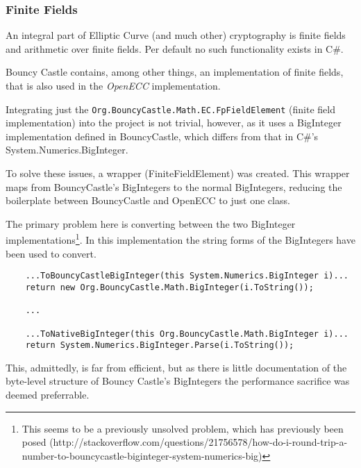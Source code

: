 \subsubsection{Finite Fields}

An integral part of Elliptic Curve (and much other) cryptography is finite fields and arithmetic
over finite fields. Per default no such functionality exists in C\#.

Bouncy Castle contains, among other things, an implementation of finite fields, that is also used
in the \emph{OpenECC} implementation.

Integrating just the \verb+Org.BouncyCastle.Math.EC.FpFieldElement+ (finite field implementation) into
the project is not trivial, however, as it uses a BigInteger implementation defined in BouncyCastle,
which differs from that in C\#'s System.Numerics.BigInteger.

To solve these issues, a wrapper (FiniteFieldElement) was created. This wrapper maps from BouncyCastle's
BigIntegers to the normal BigIntegers, reducing the boilerplate between BouncyCastle and OpenECC to
just one class.

The primary problem here is converting between the two BigInteger implementations\footnote{This seems
to be a previously unsolved problem, which has previously been posed (http://stackoverflow.com/questions/21756578/how-do-i-round-trip-a-number-to-bouncycastle-biginteger-system-numerics-big)}.
In this implementation the string forms of the BigIntegers have been used to convert.

\begin{verbatim}
	...ToBouncyCastleBigInteger(this System.Numerics.BigInteger i)...
	return new Org.BouncyCastle.Math.BigInteger(i.ToString());
	
	...
	
	...ToNativeBigInteger(this Org.BouncyCastle.Math.BigInteger i)...
	return System.Numerics.BigInteger.Parse(i.ToString());
\end{verbatim}

This, admittedly, is far from efficient, but as there is little documentation of the byte-level structure
of Bouncy Castle's BigIntegers the performance sacrifice was deemed preferrable.